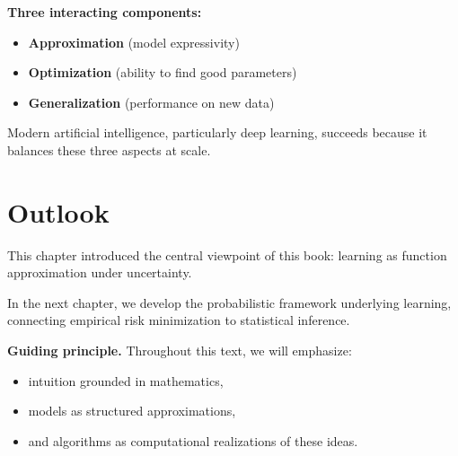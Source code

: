 \medskip

\noindent
\textbf{Three interacting components:}
\begin{itemize}
    \item \textbf{Approximation} (model expressivity)
    \item \textbf{Optimization} (ability to find good parameters)
    \item \textbf{Generalization} (performance on new data)
\end{itemize}

\medskip

Modern artificial intelligence, particularly deep learning, succeeds because it balances these three aspects at scale.

\section{Outlook}

This chapter introduced the central viewpoint of this book: learning as function approximation under uncertainty.

\medskip

In the next chapter, we develop the probabilistic framework underlying learning, connecting empirical risk minimization to statistical inference.

\medskip

\noindent
\textbf{Guiding principle.}  
Throughout this text, we will emphasize:
\begin{itemize}
    \item intuition grounded in mathematics,
    \item models as structured approximations,
    \item and algorithms as computational realizations of these ideas.
\end{itemize}
